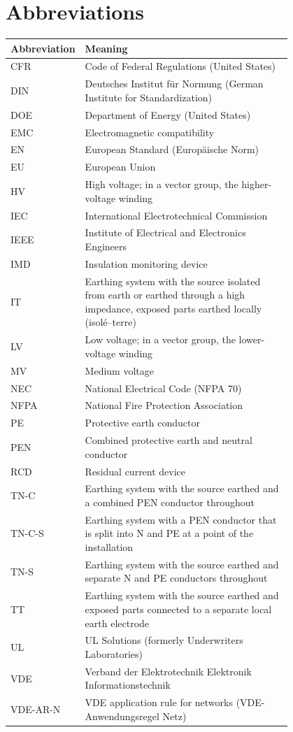 \section{Abbreviations}
\label{sec:abbreviations}

\begin{longtable}{@{}l p{0.80\linewidth}@{}}
  \toprule
  \multicolumn{1}{c}{\textbf{Abbreviation}} & \textbf{Meaning} \\
  \midrule
  \endhead
  CFR    & Code of Federal Regulations (United States) \\
  DIN    & Deutsches Institut für Normung (German Institute for Standardization) \\
  DOE    & Department of Energy (United States) \\
  EMC    & Electromagnetic compatibility \\
  EN     & European Standard (Europäische Norm) \\
  EU     & European Union \\
  HV     & High voltage; in a vector group, the higher-voltage winding \\
  IEC    & International Electrotechnical Commission \\
  IEEE   & Institute of Electrical and Electronics Engineers \\
  IMD    & Insulation monitoring device \\
  IT     & Earthing system with the source isolated from earth or earthed through a high impedance, exposed parts earthed locally (isolé--terre) \\
  LV     & Low voltage; in a vector group, the lower-voltage winding \\
  MV     & Medium voltage \\
  NEC    & National Electrical Code (NFPA 70) \\
  NFPA   & National Fire Protection Association \\
  PE     & Protective earth conductor \\
  PEN    & Combined protective earth and neutral conductor \\
  RCD    & Residual current device \\
  TN-C   & Earthing system with the source earthed and a combined PEN conductor throughout \\
  TN-C-S & Earthing system with a PEN conductor that is split into N and PE at a point of the installation \\
  TN-S   & Earthing system with the source earthed and separate N and PE conductors throughout \\
  TT     & Earthing system with the source earthed and exposed parts connected to a separate local earth electrode \\
  UL     & UL Solutions (formerly Underwriters Laboratories) \\
  VDE    & Verband der Elektrotechnik Elektronik Informationstechnik \\
  VDE-AR-N & VDE application rule for networks (VDE-Anwendungsregel Netz) \\
  \bottomrule
\end{longtable}
